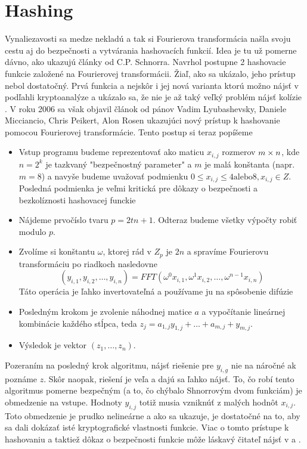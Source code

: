 \section{Hashing}

Vynaliezavosti sa medze nekladú a tak si Fourierova transformácia
našla svoju cestu aj do bezpečnosti a vytvárania hashovacích funkcií.
Idea je tu už pomerne dávno, ako ukazujú články od C.P. Schnorra.
Navrhol postupne 2 hashovacie funkcie založené na Fourierovej
transformácii. Žiaľ, ako sa ukázalo, jeho prístup nebol dostatočný.
Prvá funkcia a nejskôr i jej nová varianta ktorú možno nájsť v
\cite{schnorr} podľahli kryptoanalýze a
ukázalo sa, že nie je až taký veľký problém nájsť kolízie
\cite{ffthash_collisions}.
V roku 2006 sa však objavil článok od pánov 
Vadim Lyubashevsky,
Daniele Micciancio,
Chris Peikert,
Alon Rosen ukazujúci nový prístup k hashovanie pomocou Fourierovej
transformácie. Tento postup si teraz popíšeme

\begin{itemize}
    \item Vstup programu budeme reprezentovať ako maticu $x_{i,j}$
    rozmerov $m\times n$, kde $n=2^k$ je tazkvaný "bezpečnostný
    parameter" a $m$ je malá konštanta (napr. $m=8$) a navyše budeme
    uvažovať podmienku $0\le x_{i,j}\le 4 \text{alebo} 8, x_{i,j}\in Z$.
    Posledná podmienka je veľmi kritická pre dôkazy o bezpečnosti a
    bezkolíznosti hashovacej funckie
    \item Nájdeme prvočíslo tvaru $p=2tn+1$. Odteraz budeme všetky
    výpočty robiť modulo $p$.
    \item Zvolíme si konštantu $\omega$, ktorej rád v $Z_p$ je $2n$ 
    a spravíme Fourierovu
    transformáciu po riadkoch nasledovne
    \begin{equation}
     (y_{i,1}, y_{i,2}, \dots, y_{i,n}) = FFT(
     \omega^0 x_{i,1}, \omega^1 x_{i,2}, \dots, \omega^{n-1}
     x_{i,n})
     \end{equation}
     Táto operácia je ľahko invertovateľná a používame ju na
     spôsobenie difúzie
    \item
     Posledným krokom je zvolenie náhodnej matice $a$ a vypočítanie
     lineárnej kombinácie každého stĺpca, teda
      $z_j = a_{1,j} y_{1,j} + \dots + a_{m,j} + y_{m,j}$.
    \item
     Výsledok je vektor $(z_1, \dots, z_n)$.
\end{itemize}
Pozeraním na posledný krok algoritmu, nájsť riešenie pre 
 $y_{i,g}$ nie na náročné ak poznáme $z$. Skôr naopak, riešení je veľa a
 dajú sa ľahko nájsť.
 To, čo robí tento algoritmus pomerne bezpečným (a to, čo chýbalo
 Shnorrovým dvom funkciám) je obmedzenie na vstupe.
 Hodnoty $y_{i,j}$ totiž musia vzniknúť z malých hodnôt $x_{i,j}$.
 Toto obmedzenie je prudko nelineárne a 
 ako sa ukazuje, je dostatočné na to, aby sa dali
 dokázať isté kryptografické vlastnosti funkcie.
 Viac o tomto prístupe k hashovaniu a taktiež dôkaz o bezpečnosti
 funkcie môže láskavý čitateľ nájsť v \cite{fft-hash} a
 \cite{fft-swifft}.
